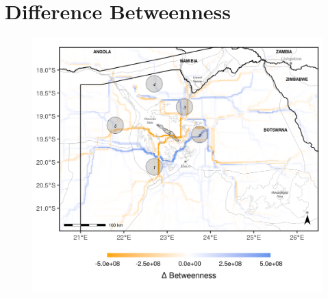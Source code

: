 \documentclass[abstract=on,10pt,a4paper,bibliography=totocnumbered]{article}
\begin{document}
\section{Difference Betweenness}
\begin{figure}[htbp]
  \begin{center}
  \includegraphics[width = \textwidth]{99_BetweennessDifference.png}
  \caption{}
  \label{BetweennessDifference}
  \end{center}
\end{figure}

\newpage
\end{document}
